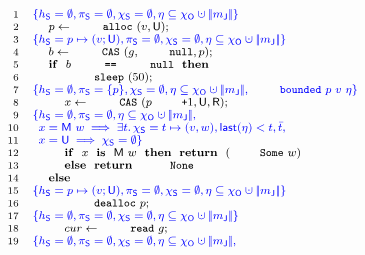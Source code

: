 {
\setlength{\belowcaptionskip}{-15pt} 
\begin{figure}
\centering
\[
{\footnotesize{
\begin{array}{rl}
 \Num{1} & \specK{\{\heaps = \emptyset, \perms = \emptyset, \hists = \emptyset, \gist \subseteq \histo \hunion \mygather{\pending} \}}
\\ 
 \Num{2} & ~~~~ p \Asgn \esc{alloc}~(v, \Unmatched);\\
 \Num{3} & \specK{\{\heaps = p \mapsto (v; \Unmatched), \perms = \emptyset, \hists = \emptyset, \gist \subseteq \histo \hunion \mygather{\pending} \}}\\
 \Num{4} & ~~~~ b \Asgn \esc{CAS}~(g, \esc{null}, p);\\
 \Num{5} & ~~~~ \kw{if}~~b~\esc{==}~\esc{null}~~\kw{then}\\
 \Num{6} & ~~~~ ~~~~ \esc{sleep}~(50);\\
 \Num{7} & \specK{\{\heaps = \emptyset, \perms = \{p\}, \hists = \emptyset, \gist \subseteq \histo \hunion \mygather{\pending}, \esc{bounded}\ p\ v\ \gist \}}\\
 \Num{8} & ~~~~ ~~~~ x \Asgn \esc{CAS}~(p\esc{+}1, \Unmatched, \Retired);\\
 \Num{9} & \specK{\{\heaps = \emptyset, \perms = \emptyset, \gist \subseteq \histo \hunion \mygather{\pending},\hbox{}} \\
\Num{10} & \specK{\hphantom{\}}x = \Matched w \implies \exists t\ldot \hists = t \mapsto (v, w), \mathsf{last}(\gist) < t, \twin t,}\\
\Num{11} & \specK{\hphantom{\}}x = \Unmatched \implies \hists = \emptyset \}}\\
\Num{12} & ~~~~ ~~~~ \kw{if}~~x~~\kw{is}~~\Matched w~~\kw{then}~~\kw{return}~~(\esc{Some}~w)\\
\Num{13} & ~~~~ ~~~~ \kw{else}~~\kw{return}~~\esc{None}\\
\Num{14} & ~~~~ \kw{else}\\
\Num{15} & \specK{\{\heaps = p \mapsto (v; \Unmatched), \perms = \emptyset, \hists = \emptyset, \gist \subseteq \histo \hunion \mygather{\pending}\}}\\
\Num{16} & ~~~~ ~~~~ \esc{dealloc}~p;\\
\Num{17} & \specK{\{\heaps = \emptyset, \perms = \emptyset, \hists = \emptyset, \gist \subseteq \histo \hunion \mygather{\pending}\}}\\
\Num{18} & ~~~~ ~~~~ cur \Asgn \esc{read}~g;\\
\Num{19} & \specK{\{\heaps = \emptyset, \perms = \emptyset, \hists = \emptyset, \gist \subseteq \histo \hunion \mygather{\pending},}\\

\end{array}}}\]
\end{figure}}
